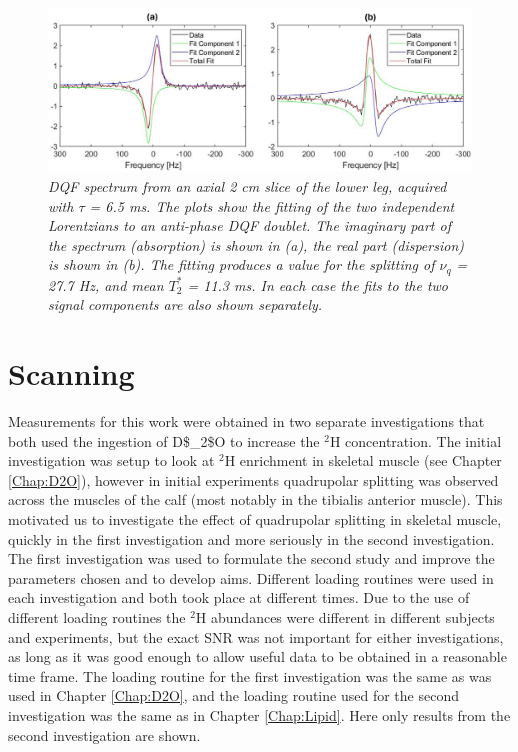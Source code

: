 \begin{figure}
    \centering
    \includegraphics[width=1\textwidth]{Figures/Quad/Example_DQF.png}
    \caption{\textit{\ac{DQF} spectrum from an axial 2 cm slice of the lower leg, acquired with $\tau$ = 6.5 ms. The plots show the fitting of the two independent Lorentzians to an anti-phase \ac{DQF} doublet. The imaginary part of the spectrum (absorption) is shown in (a), the real part (dispersion) is shown in (b). The fitting produces a value for the splitting of $\nu_q$ = 27.7 Hz, and mean $T_2^*$ = 11.3 ms. In each case the fits to the two signal components are also shown separately.}}
    \label{fig:Quad:Ex_DQF}
\end{figure}

\section{Scanning}

Measurements for this work were obtained in two separate investigations that both used the ingestion of \ac{D$_2$O} to increase the $^2$H concentration. The initial investigation was setup to look at $^2$H enrichment in skeletal muscle (see Chapter \ref{Chap:D2O}), however in initial experiments quadrupolar splitting was observed across the muscles of the calf (most notably in the tibialis anterior muscle). This motivated us to investigate the effect of quadrupolar splitting in skeletal muscle, quickly in the first investigation and more seriously in the second investigation. The first investigation was used to formulate the second study and improve the parameters chosen and to develop aims. Different loading routines were used in each investigation and both took place at different times. Due to the use of different loading routines the $^2$H abundances were different in different subjects and experiments, but the exact \ac{SNR} was not important for either investigations, as long as it was good enough to allow useful data to be obtained in a reasonable time frame. The loading routine for the first investigation was the same as was used in Chapter \ref{Chap:D2O}, and the loading routine used for the second investigation was the same as in Chapter \ref{Chap:Lipid}. Here only results from the second investigation are shown.

